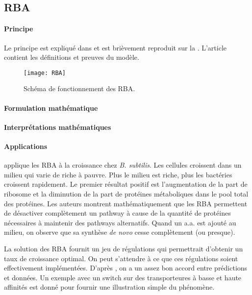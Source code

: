 \subsection{RBA}

\paragraph{Principe}

Le principe est expliqué dans \citet{goelzer_cell_2011} et est brièvement reproduit sur la . L'article contient les définitions et preuves du modèle.

\begin{figure}[ht]
  \centering
  \texttt{[image: RBA]}
  \caption{Schéma de fonctionnement des RBA.}
  \label{fig:rba}
\end{figure}

\paragraph{Formulation mathématique}

\paragraph{Interprétations mathématiques}

\paragraph{Applications}
\citet{goelzer_cell_2011} applique les RBA à la croissance chez \textit{B. subtilis}. Les cellules croissent dans un milieu qui varie de riche à pauvre. Plus le milieu est riche, plus les bactéries croissent rapidement. Le premier résultat positif est l'augmentation de la part de ribosome et la diminution de la part de protéines métaboliques dans le pool total des protéines. Les auteurs montrent mathématiquement que les RBA permettent de désactiver complètement un pathway à cause de la quantité de protéines nécessaires à maintenir des pathways alternatifs. Quand un a.a. est ajouté au milieu, on observe que sa synthèse \textit{de novo} cesse complètement (ou presque).

La solution des RBA fournit un jeu de régulations qui permettrait d'obtenir un taux de croissance optimal. On peut s'attendre à ce que ces régulations soient effectivement implémentées. D'après \citet{goelzer_cell_2011}, on a un assez bon accord entre prédictions et données. Un exemple avec un switch sur des transporteures à basse et haute affinités est donné pour fournir une illustration simple du phénomène.

